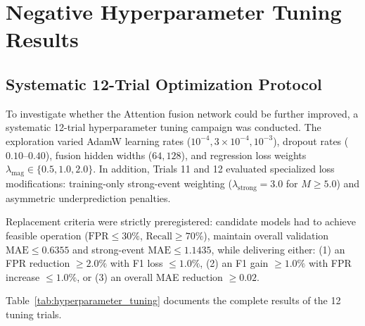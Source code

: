\documentclass[journal]{IEEEtran}
\begin{document}
\section{Negative Hyperparameter Tuning Results}

\subsection{Systematic 12-Trial Optimization Protocol}
To investigate whether the Attention fusion network could be further improved, a systematic 12-trial hyperparameter tuning campaign was conducted. The exploration varied AdamW learning rates ($10^{-4}, 3 \times 10^{-4}, 10^{-3}$), dropout rates ($0.10$--$0.40$), fusion hidden widths ($64, 128$), and regression loss weights $\lambda_{\text{mag}} \in \{0.5, 1.0, 2.0\}$. In addition, Trials 11 and 12 evaluated specialized loss modifications: training-only strong-event weighting ($\lambda_{\text{strong}} = 3.0$ for $M \ge 5.0$) and asymmetric underprediction penalties.

Replacement criteria were strictly preregistered: candidate models had to achieve feasible operation ($\text{FPR} \le 30\%$, $\text{Recall} \ge 70\%$), maintain overall validation $\text{MAE} \le 0.6355$ and strong-event $\text{MAE} \le 1.1435$, while delivering either: (1) an FPR reduction $\ge 2.0\%$ with F1 loss $\le 1.0\%$, (2) an F1 gain $\ge 1.0\%$ with FPR increase $\le 1.0\%$, or (3) an overall MAE reduction $\ge 0.02$.

Table~\ref{tab:hyperparameter_tuning} documents the complete results of the 12 tuning trials.
\end{document}
